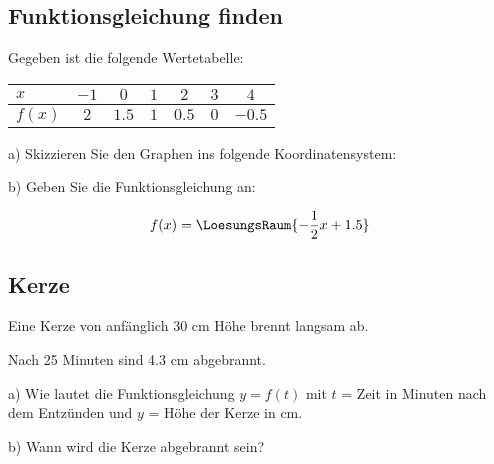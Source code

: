 
\subsection{Funktionsgleichung finden}
Gegeben ist die folgende Wertetabelle:

\begin{tabular}{l|c|c|c|c|c|c|}
$x$    & $-1$ & $0$   & $1$ & $2$   & $3$ & $4$ \\\hline
$f(x)$ & $2$  & $1.5$ & $1$ & $0.5$ & $0$ & $-0.5$ \\
\end{tabular}

a) Skizzieren Sie den Graphen ins folgende Koordinatensystem:


b) Geben Sie die Funktionsgleichung an:

$$f(x) = \LoesungsRaum{-\frac12x+1.5}$$
\TNTeop{}

\subsection{Kerze}
Eine Kerze von anfänglich 30 cm Höhe brennt langsam ab.

Nach 25 Minuten sind 4.3 cm abgebrannt.

a) Wie lautet die Funktionsgleichung $y=f(t)$ mit $t$ = Zeit in Minuten
nach dem Entzünden und $y$ = Höhe der Kerze in cm.

b) Wann wird die Kerze abgebrannt sein?

